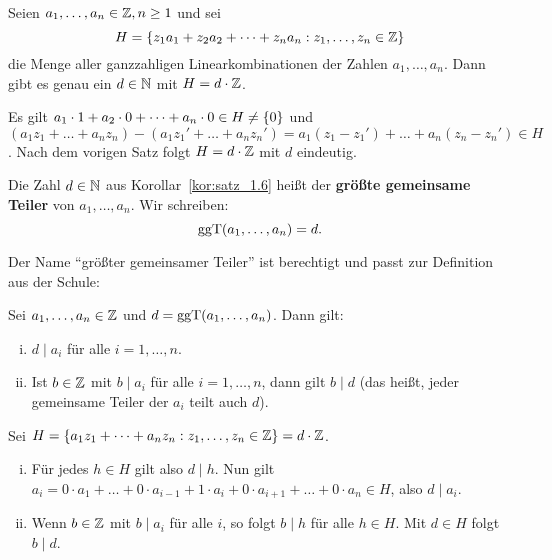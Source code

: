 	\begin{korollar}
		\label{kor:satz_1.6}
		Seien $a_1,\dots,a_n \in \mathbb{Z}, n \geq 1$ und sei
		\[
			H = \{z_1a_1 + z_2a_2 + \dots + z_na_n : z_1,\dots,z_n \in \mathbb{Z}\}
		\]
		die Menge aller ganzzahligen Linearkombinationen der Zahlen $a_1,\dots,a_n$.
		Dann gibt es genau ein $d \in \mathbb{N}$ mit $H = d \cdot \mathbb{Z}$.
	\end{korollar}

	\begin{beweis}
		Es gilt $a_1 \cdot 1 + a_2 \cdot 0 + \dots + a_n \cdot 0 \in H \neq \{0\}$ und $(a_1z_1 + \dots + a_nz_n) - (a_1z_1' + \dots + a_nz_n') = a_1(z_1-z_1') + \dots + a_n(z_n-z_n') \in H$.
		Nach dem vorigen Satz folgt $H = d \cdot \mathbb{Z}$ mit $d$ eindeutig.		
	\end{beweis}
	\newpage
	\begin{definition}
		Die Zahl $d \in \mathbb{N}$ aus Korollar~\ref{kor:satz_1.6} heißt der \textbf{größte gemeinsame Teiler} von $a_1,\dots,a_n$. 
		Wir schreiben:
		\[
			\operatorname{ggT}(a_1,\dots,a_n) = d.
		\]
	\end{definition}

	Der Name \enquote{größter gemeinsamer Teiler} ist berechtigt und passt zur Definition aus der Schule:
	
	\begin{lemma}
		\label{lem:1.7}
		Sei $a_1,\dots,a_n \in \mathbb{Z}$ und $d = \operatorname{ggT}(a_1,\dots,a_n)$. \marginnote{[7]}
		Dann gilt:
		\begin{enumerate}[(i)]
			\item $d \mid a_i$ für alle $i = 1,\dots,n$.
			\item Ist $b \in \mathbb{Z}$ mit $b \mid a_i$ für alle $i=1,\dots,n$, dann gilt $b \mid d$ (das heißt, jeder gemeinsame Teiler der $a_i$ teilt auch $d$).
		\end{enumerate}
	\end{lemma}

	\begin{beweis}
		Sei $H = \{a_1z_1 + \dots + a_nz_n : z_1,\dots,z_n \in \mathbb{Z}\} = d \cdot \mathbb{Z}$.
		\begin{enumerate}[(i)]
			\item Für jedes $h \in H$ gilt also $d \mid h$.
			Nun gilt $a_i = 0 \cdot a_1 + \dots + 0 \cdot a_{i-1} + 1 \cdot a_i + 0 \cdot a_{i+1} + \dots + 0 \cdot a_n \in H$, also $d \mid a_i$.
			\item Wenn $b \in \mathbb{Z}$ mit $b \mid a_i$ für alle $i$, so folgt $b \mid h$ für alle $h \in H$.
			Mit $d \in H$ folgt $b \mid d$.
		\end{enumerate}
	\end{beweis}


